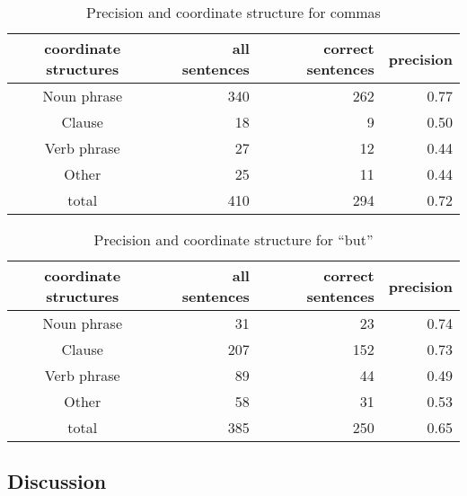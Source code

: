   \begin{table}
    \caption{Precision and coordinate structure for commas}
    \label{COMMAPREC2}
    \begin{center}
      \begin{tabular}{|c|r|r|r|}
        \hline
coordinate structures  & all sentences & correct sentences & precision\\
        \hline
Noun phrase & 340 & 262 & 0.77 \\
Clause & 18 & 9 & 0.50 \\
Verb phrase & 27 & 12 & 0.44 \\
Other & 25 & 11 & 0.44 \\
        \hline
total & 410 & 294 & 0.72 \\
        \hline
      \end{tabular}
    \end{center}
  \end{table}

  \begin{table}
    \caption{Precision and coordinate structure for ``but''}
    \label{BUTPREC2}
    \begin{center}
      \begin{tabular}{|c|r|r|r|}
        \hline
coordinate structures  & all sentences & correct sentences & precision \\
        \hline
Noun phrase & 31 & 23 & 0.74 \\
Clause & 207 & 152 & 0.73 \\
Verb phrase & 89 & 44 & 0.49 \\
Other & 58 & 31 & 0.53 \\
        \hline
total & 385 & 250 & 0.65 \\
        \hline
      \end{tabular}
    \end{center}
  \end{table}

\newpage

\subsection{Discussion}

